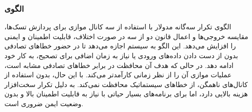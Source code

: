 \subsubsection{الگوی }
\label{archSafeTripModRedunSec}
\begin{RTL}
الگوی تکرار سه‌گانه مدولار  \cite{ref4} با استفاده از سه کانال
موازی برای پردازش تسک‌ها، مقایسه خروجی‌ها و اعمال قانون دو از سه
در صورت اختلاف، قابلیت اطمینان و ایمنی را افزایش می‌دهد. این الگو به
سیستم اجازه می‌دهد تا در حضور خطاهای تصادفی بدون از دست دادن داده‌های
ورودی یا نیاز به زمان اضافی برای تصحیح، به کار خود ادامه دهد.
در حالی که هدف آن محافظت در برابر خطاهای تصادفی مشابه
 است، عملیات موازی
 آن را از نظر زمانی کارآمدتر می‌کند.
با این حال، بدون استفاده از کانال‌های ناهمگن، از خطاهای سیستماتیک
محافظت نمی‌کند.  به دلیل تکرار سخت‌افزار هزینه بالایی دارد،
اما برای برنامه‌های بسیار حیاتی با نیاز به قابلیت اطمینان بالا
و بدون وضعیت ایمن ضروری است.
\end{RTL}